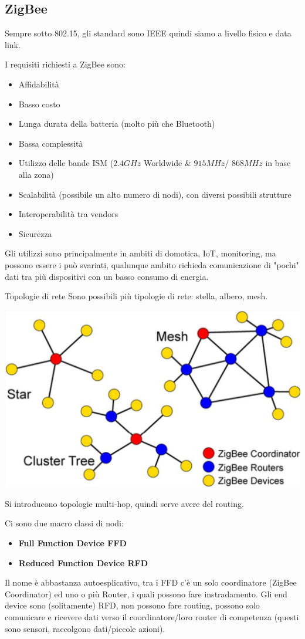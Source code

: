 \subsection{ZigBee}
Sempre sotto 802.15, gli standard sono IEEE quindi siamo a livello fisico e data link.

I requisiti richiesti a ZigBee sono: 
\begin{itemize}
	\item Affidabilità
	\item Basso costo
	\item Lunga durata della batteria (molto più che Bluetooth)
	\item Bassa complessità
	\item Utilizzo delle bande ISM ($2.4GHz$ Worldwide \& $915 MHz$/ $868MHz$ in base alla zona)
	\item Scalabilità (possibile un alto numero di nodi), con diversi possibili strutture
	\item Interoperabilità tra vendors
	\item Sicurezza
\end{itemize}

Gli utilizzi sono principalmente in ambiti di domotica, IoT, monitoring, ma possono essere i può svariati, qualunque ambito richieda comunicazione di "pochi" dati tra più dispositivi con un basso consumo di energia.

Topologie di rete
Sono possibili più tipologie di rete: stella, albero, mesh.
\begin{center}
	\includegraphics[width=0.5\linewidth]{img/wpan/ztopology}
\end{center}

Si introducono topologie multi-hop, quindi serve avere del routing.

Ci sono due macro classi di nodi: 
\begin{itemize}
	\item \textbf{Full Function Device FFD}
	\item \textbf{Reduced Function Device RFD}
\end{itemize}
Il nome è abbastanza autoesplicativo, tra i FFD c'è un solo coordinatore (ZigBee Coordinator) ed uno o più Router, i quali possono fare instradamento. Gli end device sono (solitamente) RFD, non possono fare routing, possono solo comunicare e ricevere dati verso il coordinatore/loro router di competenza (questi sono sensori, raccolgono dati/piccole azioni).

